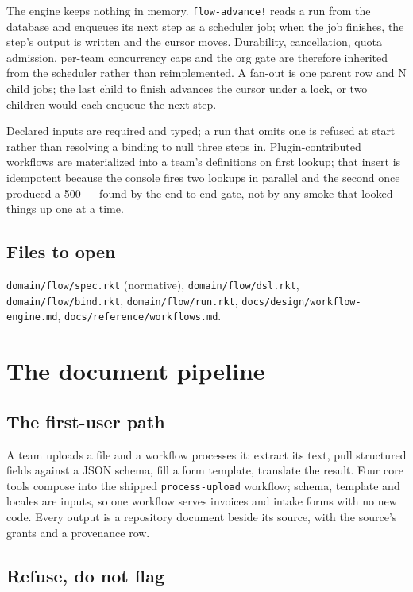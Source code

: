 \documentclass[11pt,a4paper]{report}
\gdef\currentchapterart{art/telemachus-head.png}
\newcommand{\chapterart}[1]{\gdef\currentchapterart{#1}}
\newcommand{\chapterart}[1]{}
\begin{document}
The engine keeps nothing in memory. \texttt{flow-advance!} reads a run from the database and enqueues its next step as a scheduler job; when the job finishes, the step's output is written and the cursor moves. Durability, cancellation, quota admission, per-team concurrency caps and the org gate are therefore inherited from the scheduler rather than reimplemented. A fan-out is one parent row and N child jobs; the last child to finish advances the cursor under a lock, or two children would each enqueue the next step.

Declared inputs are required and typed; a run that omits one is refused at start rather than resolving a binding to null three steps in. Plugin-contributed workflows are materialized into a team's definitions on first lookup; that insert is idempotent because the console fires two lookups in parallel and the second once produced a 500 --- found by the end-to-end gate, not by any smoke that looked things up one at a time.

\section{Files to open}

\texttt{domain/flow/spec.rkt} (normative), \texttt{domain/flow/dsl.rkt}, \texttt{domain/flow/bind.rkt}, \texttt{domain/flow/run.rkt}, \texttt{docs/design/workflow-engine.md}, \texttt{docs/reference/workflows.md}.

\chapterart{art/ch-09-pipeline.png}
\chapter{The document pipeline}

\section{The first-user path}

A team uploads a file and a workflow processes it: extract its text, pull structured fields against a JSON schema, fill a form template, translate the result. Four core tools compose into the shipped \texttt{process-upload} workflow; schema, template and locales are inputs, so one workflow serves invoices and intake forms with no new code. Every output is a repository document beside its source, with the source's grants and a provenance row.

\section{Refuse, do not flag}
\end{document}
